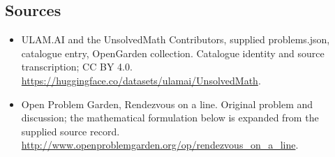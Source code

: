 \documentclass[11pt,a4paper]{article}
\begin{document}
\subsection{Sources}
\begin{itemize}
\item[S1] ULAM.AI and the UnsolvedMath Contributors, supplied problems.json, catalogue entry, OpenGarden collection. Catalogue identity and source transcription; CC BY 4.0.
\url{https://huggingface.co/datasets/ulamai/UnsolvedMath}.
\item[S2] Open Problem Garden, Rendezvous on a line. Original problem and discussion; the mathematical formulation below is expanded from the supplied source record.
\url{http://www.openproblemgarden.org/op/rendezvous_on_a_line}.

\end{itemize}
\end{document}
